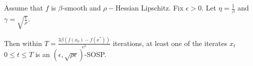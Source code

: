 

\begin{theorem}
    Assume that \(f\) is \(\beta\)-smooth and \(\rho-\)Hessian Lipschitz. Fix \(\epsilon > 0\). Let \(\eta = \frac{1}{\beta}\) and \(\gamma = \sqrt{\frac{\epsilon}{\rho}}\). 

    Then within \(T = \frac{3 \beta \left( f(x_0) - f(x^*)\right)}{\epsilon^2}\) iterations, at least one of the iterates \(x_t\) \(0 \leq t \leq T\) is an \((\epsilon, \sqrt{\rho \epsilon})\)-SOSP.
\end{theorem}

